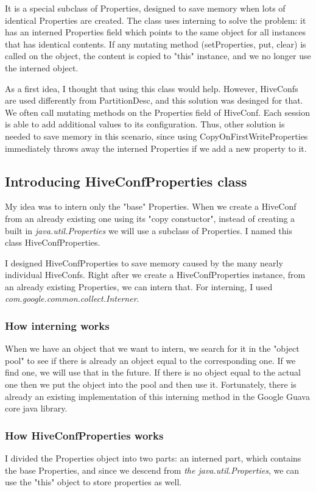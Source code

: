 It is a special subclass of Properties, designed to save memory when lots of identical Properties are created. The class uses interning to solve the problem: it has an interned Properties field which points to the same object for all instances that has identical contents. If any mutating method (\eg setProperties, put, clear) is called on the object, the content is copied to "this" instance, and we no longer use the interned object. 

As a first idea, I thought that using this class would help. However, HiveConfs are used differently from PartitionDesc, and this solution was desinged for that. We often call mutating methods on the Properties field of HiveConf. Each session is able to add additional values to its configuration. Thus, other solution is needed to save memory in this scenario, since using CopyOnFirstWriteProperties immediately throws away the interned Properties if we add a new property to it.

\subsection{Introducing HiveConfProperties class}
My idea was to intern only the "base" Properties. When we create a HiveConf from an already existing one using its "copy constuctor", instead of creating a built in \textit{java.util.Properties} we will use a subclass of Properties. I named this class HiveConfProperties. 

I designed HiveConfProperties to save memory caused by the many nearly individual HiveConfs. Right after we create a HiveConfProperties instance, from an already existing Properties, we can intern that. For interning, I used \textit{com.google.common.collect.Interner}. 

\subsubsection{How interning works} 
 When we have an object that we want to intern, we search for it in the "object pool" to see if there is already an object equal to the corresponding one. If we find one, we will use that in the future. If there is no object equal to the actual one then we put the object into the pool and then use it. Fortunately, there is already an existing implementation of this interning method in the Google Guava core java library.
 
 \subsubsection{How HiveConfProperties works}
 I divided the Properties object into two parts: an interned part, which contains the base Properties, and since we descend from \textit{the java.util.Properties}, we can use the "this" object to store properties as well.
 

